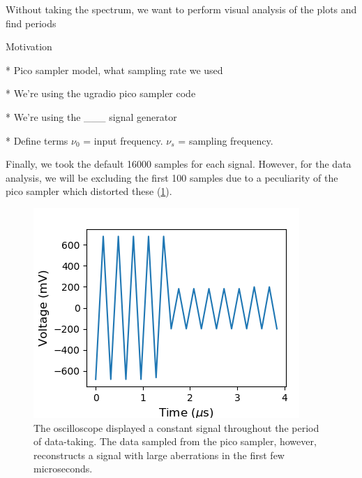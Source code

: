 \documentclass[a4paper]{article}
\begin{document}
Without taking the spectrum, we want to perform visual analysis of the plots and find periods

Motivation

* Pico sampler model, what sampling rate we used

* We're using the ugradio pico sampler code

* We're using the \_\_\_ signal generator

* Define terms $\nu_0$ = input frequency. $\nu_s$ = sampling frequency.

Finally, we took the default 16000 samples for each signal. However, for the data analysis, we will be excluding the first 100 samples due to a peculiarity of the pico sampler which distorted these (\ref{fig:pico_start}).


\begin{figure}
\centering
\includegraphics{pico_bad} %
\caption{\label{fig:pico_start}The oscilloscope displayed a constant signal throughout the period of data-taking. The data sampled from the pico sampler, however, reconstructs a signal with large aberrations in the first few microseconds.}
\end{figure}
\end{document}
